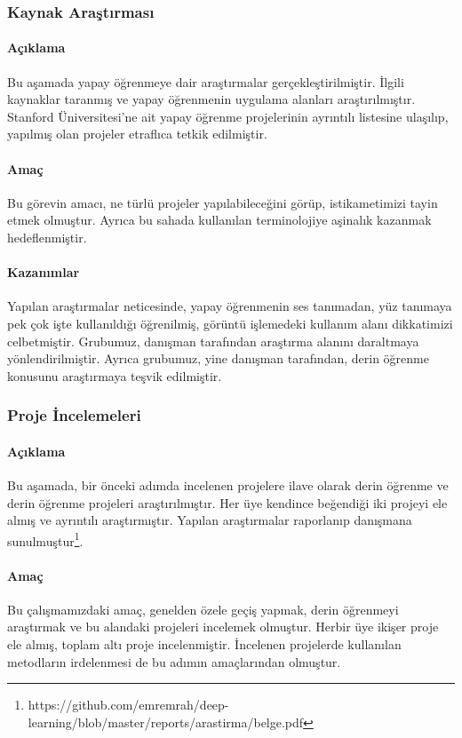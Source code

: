\documentclass[12pt,a4paper]{article}
\begin{document}
    \subsubsection{Kaynak Araştırması}
    \paragraph{Açıklama}
    Bu aşamada yapay öğrenmeye dair araştırmalar gerçekleştirilmiştir. İlgili kaynaklar taranmış ve yapay öğrenmenin uygulama alanları araştırılmıştır.
    Stanford Üniversitesi'ne ait yapay öğrenme projelerinin ayrıntılı listesine ulaşılıp, yapılmış olan projeler etraflıca tetkik edilmiştir.

    \paragraph{Amaç}
    Bu görevin amacı, ne türlü projeler yapılabileceğini görüp, istikametimizi tayin etmek olmuştur. 
    Ayrıca bu sahada kullanılan terminolojiye aşinalık kazanmak hedeflenmiştir.

    \paragraph{Kazanımlar}
    Yapılan araştırmalar neticesinde, yapay öğrenmenin ses tanımadan, yüz tanımaya pek çok işte kullanıldığı öğrenilmiş,
     görüntü işlemedeki kullanım alanı dikkatimizi celbetmiştir. Grubumuz, danışman tarafından araştırma alanını
     daraltmaya yönlendirilmiştir. Ayrıca grubumuz, yine danışman tarafından, derin öğrenme konusunu araştırmaya teşvik edilmiştir.

    \subsubsection{Proje İncelemeleri}
    \paragraph{Açıklama}
    Bu aşamada, bir önceki adımda incelenen projelere ilave olarak derin öğrenme ve derin öğrenme projeleri araştırılmıştır. Her üye kendince beğendiği iki projeyi ele almış
    ve ayrıntılı araştırmıştır. Yapılan araştırmalar raporlanıp danışmana sunulmuştur\footnote{https://github.com/emremrah/deep-learning/blob/master/reports/arastirma/belge.pdf}.

    \paragraph{Amaç}
    Bu çalışmamızdaki amaç, genelden özele geçiş yapmak, derin öğrenmeyi araştırmak ve bu alandaki projeleri incelemek olmuştur. Herbir üye ikişer proje ele almış, toplam altı proje incelenmiştir. 
    İncelenen projelerde kullanılan metodların irdelenmesi de bu adımın amaçlarından olmuştur.
\end{document}
